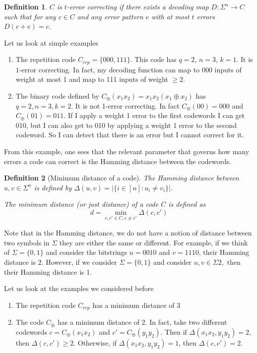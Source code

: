 \documentclass{article}
\newtheorem{defi}{Definition}
\begin{document}
\begin{defi}
$C$ is $t$-error correcting if there exists a decoding map $D: \Sigma^n \to C$ such that for
any $c \in C$ and any error pattern $e$ with at most $t$ errors $D(c + e) = c$.
\end{defi}

Let us look at simple examples
\begin{enumerate}
\item The repetition code $C_{rep} = \{000, 111\}$. This code has $q = 2$, $n = 3$, $k = 1$. It is $1$-error
correcting. In fact, my decoding function can map to 000 inputs of weight at most 1 and map
to 111 inputs of weight $\geq 2$.
\item The binary code defined by $C_\oplus(x_1x_2) = x_1x_2(x_1 \oplus x_2)$ has $q = 2, n = 3, k = 2$. It is not 1-error correcting. In fact $C_\oplus(00) = 000$ and $C_\oplus(01) = 011$. If I apply a weight 1 error to the first codewords I can get 010, but I can also get to 010 by applying a weight 1 error to the second codeword. So I can detect that there is an error but I cannot correct for it.
\end{enumerate}
From this example, one sees that the relevant parameter that governs how many errors a code can correct is the Hamming distance between the codewords.
\begin{defi}[Minimum distance of a code]
The Hamming distance between $u,v \in \Sigma^n$ is
defined by $\Delta(u, v) = |\{ i \in [n] : u_i \neq v_i\}|$.

The minimum distance (or just distance) of a code $C$ is defined as
\[
d = \min_{c,c' \in C, c\neq c'} \Delta (c, c') 
\]
\end{defi}


Note that in the Hamming distance, we do not have a notion of distance between two symbols in $\Sigma$ they are either the same or different. For example, if we think of $\Sigma = \{0, 1\}$ and consider the bitstrings $u = 0010$ and $v = 1110$, their Hamming distance is 2. However, if we consider $\Sigma = \{0, 1\}$ and consider $u, v \in \Sigma 2,$ then their Hamming distance is 1.

Let us look at the examples we considered before
\begin{enumerate}
\item The repetition code $C_{rep}$ has a minimum distance of 3
\item The code $C_{\oplus}$ has a minimum distance of 2. In fact, take two different codewords $c = C_\oplus (x_1x_2)$ and $c' = C_\oplus (y_1y_2)$. Then if $\Delta (x_1x_2, y_1y_2) = 2$, then $\Delta (c, c') \geq 2$. Otherwise, if $\Delta (x_1x_2, y_1y_2) = 1$, then $\Delta (c, c') = 2$.
\end{enumerate}
\end{document}
